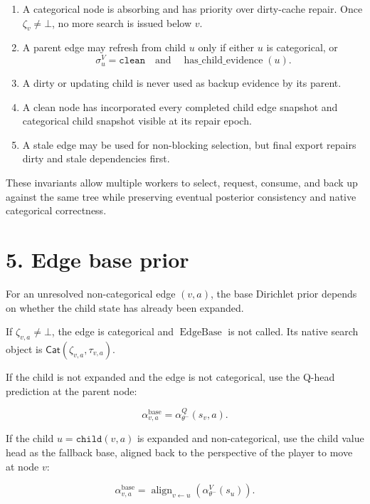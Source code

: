 \documentclass[11pt]{article}
\newcommand{\Align}{\operatorname{align}}
\newcommand{\EdgeBase}{\operatorname{EdgeBase}}
\newcommand{\CatObj}{\mathsf{Cat}}
\begin{document}
\begin{enumerate}[leftmargin=2em]
  \item A categorical node is absorbing and has priority over dirty-cache repair.
  Once \(\zeta_v\ne\bot\), no more search is issued below \(v\).

  \item A parent edge may refresh from child \(u\) only if either \(u\) is
  categorical, or
  \[
  \sigma^V_u=\texttt{clean}
  \quad\text{and}\quad
  \operatorname{has\_child\_evidence}(u).
  \]

  \item A dirty or updating child is never used as backup evidence by its
  parent.

  \item A clean node has incorporated every completed child edge snapshot and
  categorical child snapshot visible at its repair epoch.

  \item A stale edge may be used for non-blocking selection, but final export
  repairs dirty and stale dependencies first.
\end{enumerate}

These invariants allow multiple workers to select, request, consume, and back up
against the same tree while preserving eventual posterior consistency and native
categorical correctness.

\section*{5. Edge base prior}

For an unresolved non-categorical edge \((v,a)\), the base Dirichlet prior
depends on whether the child state has already been expanded.

If \(\zeta_{v,a}\ne\bot\), the edge is categorical and \(\EdgeBase\) is not
called. Its native search object is \(\CatObj(\zeta_{v,a},\tau_{v,a})\).

If the child is not expanded and the edge is not categorical, use the Q-head
prediction at the parent node:

\[
\alpha^{\mathrm{base}}_{v,a}
=
\alpha_{\theta^-}^Q(s_v,a).
\]

If the child \(u=\texttt{child}(v,a)\) is expanded and non-categorical, use the
child value head as the fallback base, aligned back to the perspective of the
player to move at node \(v\):

\[
\alpha^{\mathrm{base}}_{v,a}
=
\Align_{v \leftarrow u}
\left(
\alpha_{\theta^-}^V(s_u)
\right).
\]
\end{document}
